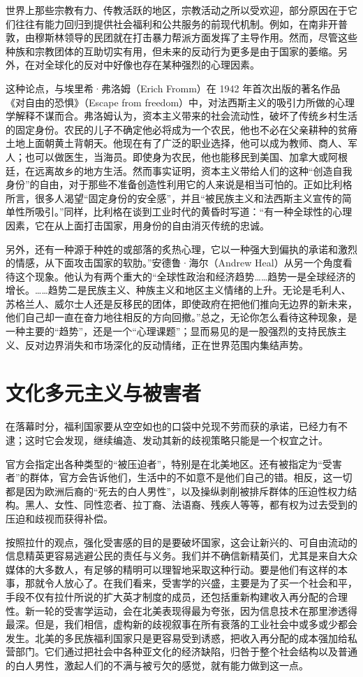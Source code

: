世界上那些宗教有力、传教活跃的地区，宗教活动之所以受欢迎，部分原因在于它们往往有能力回归到提供社会福利和公共服务的前现代机制。例如，在南非开普敦，由穆斯林领导的民团就在打击暴力帮派方面发挥了主导作用。然而，尽管这些种族和宗教团体的互助切实有用，但未来的反动行为更多是由于国家的萎缩。另外，在对全球化的反对中好像也存在某种强烈的心理因素。

这种论点，与埃里希·弗洛姆（Erich Fromm）在 1942 年首次出版的著名作品《对自由的恐惧》（Escape from freedom）中，对法西斯主义的吸引力所做的心理学解释不谋而合。弗洛姆认为，资本主义带来的社会流动性，破坏了传统乡村生活的固定身份。农民的儿子不确定他必将成为一个农民，他也不必在父亲耕种的贫瘠土地上面朝黄土背朝天。他现在有了广泛的职业选择，他可以成为教师、商人、军人；也可以做医生，当海员。即使身为农民，他也能移民到美国、加拿大或阿根廷，在远离故乡的地方生活。然而事实证明，资本主义带给人们的这种“创造自我身份”的自由，对于那些不准备创造性利用它的人来说是相当可怕的。正如比利格所言，很多人渴望“固定身份的安全感”，并且“被民族主义和法西斯主义宣传的简单性所吸引。”同样，比利格在谈到工业时代的黄昏时写道：“有一种全球性的心理因素，它在从上面打击国家，用身份的自由消灭传统的忠诚。

另外，还有一种源于种姓的或部落的炙热心理，它以一种强大到偏执的承诺和激烈的情感，从下面攻击国家的软肋。”安德鲁·海尔（Andrew Heal）从另一个角度看待这个现象。他认为有两个重大的“全球性政治和经济趋势……趋势一是全球经济的增长。……趋势二是民族主义、种族主义和地区主义情绪的上升。无论是毛利人、苏格兰人、威尔士人还是反移民的团体，即使政府在把他们推向无边界的新未来，他们自己却一直在奋力地往相反的方向回撤。”总之，无论你怎么看待这种现象，是一种主要的“趋势”，还是一个“心理课题”；显而易见的是一股强烈的支持民族主义、反对边界消失和市场深化的反动情绪，正在世界范围内集结声势。

\section{文化多元主义与被害者}
在落幕时分，福利国家要从空空如也的口袋中兑现不劳而获的承诺，已经力有不逮；这时它会发现，继续编造、发动其新的歧视策略只能是一个权宜之计。

官方会指定出各种类型的“被压迫者”，特别是在北美地区。还有被指定为“受害者”的群体，官方会告诉他们，生活中的不如意不是他们自己的错。相反，这一切都是因为欧洲后裔的“死去的白人男性”，以及操纵剥削被排斥群体的压迫性权力结构。黑人、女性、同性恋者、拉丁裔、法语裔、残疾人等等，都有权为过去受到的压迫和歧视而获得补偿。

按照拉什的观点，强化受害感的目的是要破坏国家，这会让新兴的、可自由流动的信息精英更容易逃避公民的责任与义务。我们并不确信新精英们，尤其是来自大众媒体的大多数人，有足够的精明可以理智地采取这种行动。要是他们有这样的本事，那就令人放心了。在我们看来，受害学的兴盛，主要是为了买一个社会和平，手段不仅有拉什所说的扩大英才制度的成员，还包括重新构建收入再分配的合理性。新一轮的受害学运动，会在北美表现得最为夸张，因为信息技术在那里渗透得最深。但是，我们相信，虚构新的歧视叙事在所有衰落的工业社会中或多或少都会发生。北美的多民族福利国家只是更容易受到诱惑，把收入再分配的成本强加给私营部门。它们通过把社会中各种亚文化的经济缺陷，归咎于整个社会结构以及普通的白人男性，激起人们的不满与被亏欠的感觉，就有能力做到这一点。


